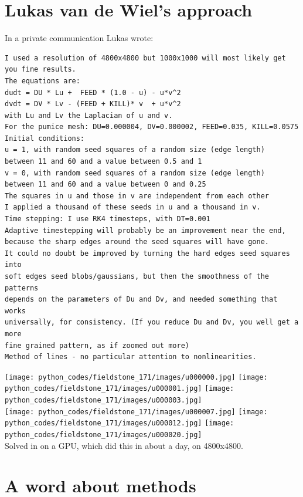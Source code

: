 \section*{Lukas van de Wiel's approach}

In a private communication Lukas wrote:
{\small 
\begin{verbatim}
I used a resolution of 4800x4800 but 1000x1000 will most likely get you fine results.
The equations are:
dudt = DU * Lu +  FEED * (1.0 - u) - u*v^2
dvdt = DV * Lv - (FEED + KILL)* v  + u*v^2
with Lu and Lv the Laplacian of u and v.
For the pumice mesh: DU=0.000004, DV=0.000002, FEED=0.035, KILL=0.0575
Initial conditions:
u = 1, with random seed squares of a random size (edge length) 
between 11 and 60 and a value between 0.5 and 1
v = 0, with random seed squares of a random size (edge length) 
between 11 and 60 and a value between 0 and 0.25
The squares in u and those in v are independent from each other
I applied a thousand of these seeds in u and a thousand in v.
Time stepping: I use RK4 timesteps, with DT=0.001
Adaptive timestepping will probably be an improvement near the end,  
because the sharp edges around the seed squares will have gone.
It could no doubt be improved by turning the hard edges seed squares into 
soft edges seed blobs/gaussians, but then the smoothness of the patterns
depends on the parameters of Du and Dv, and needed something that works 
universally, for consistency. (If you reduce Du and Dv, you well get a more 
fine grained pattern, as if zoomed out more) 
Method of lines - no particular attention to nonlinearities. 
\end{verbatim}
}

\begin{center}
\texttt{[image: python\_codes/fieldstone\_171/images/u000000.jpg]}
\texttt{[image: python\_codes/fieldstone\_171/images/u000001.jpg]}
\texttt{[image: python\_codes/fieldstone\_171/images/u000003.jpg]}\\
\texttt{[image: python\_codes/fieldstone\_171/images/u000007.jpg]}
\texttt{[image: python\_codes/fieldstone\_171/images/u000012.jpg]}
\texttt{[image: python\_codes/fieldstone\_171/images/u000020.jpg]}\\
{\captionfont Solved in on a GPU, which did this in about a day, on 4800x4800.}
\end{center}

\section*{A word about methods}

